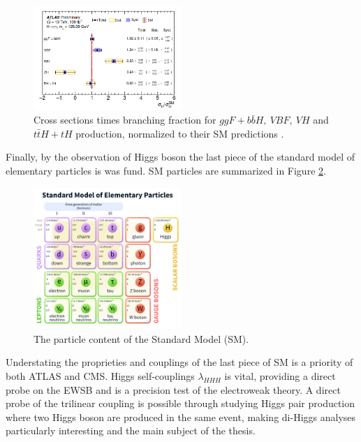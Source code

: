 \begin{figure}[H]
    \centering
    \includegraphics[width=0.5\textwidth]{Ch1/Img/HXsecRun2.png}
    \caption{Cross sections times branching fraction for $ggF+b\bar{b}H , \ VBF, \ VH$ and $t\bar{t}H + tH$ production, normalized to their SM predictions \cite{ATLAS_2020}.}
    \label{fig:chap1:H2012:HXsecRun2}
\end{figure}
Finally, by the observation of Higgs boson the last piece of the standard model of elementary particles is was fund. SM particles are summarized in Figure \ref{fig:chap1:H2012:SM}.
\begin{figure}[H]
    \centering
    \includegraphics[width=0.5\textwidth]{Ch1/Img/SM_particles.png}
    \caption{The particle content of the Standard Model (SM).}
    \label{fig:chap1:H2012:SM}
\end{figure}
Understating the proprieties and couplings of the last piece of SM is a priority of both ATLAS and CMS. Higgs self-couplings $\lambda_{HHH}$ is vital, providing a direct probe on the EWSB and is a precision test of the electroweak theory. A direct probe of the trilinear coupling is possible through studying Higgs pair production where two Higgs boson are produced in the same event, making di-Higgs analyses particularly interesting and the main subject of the thesis.

